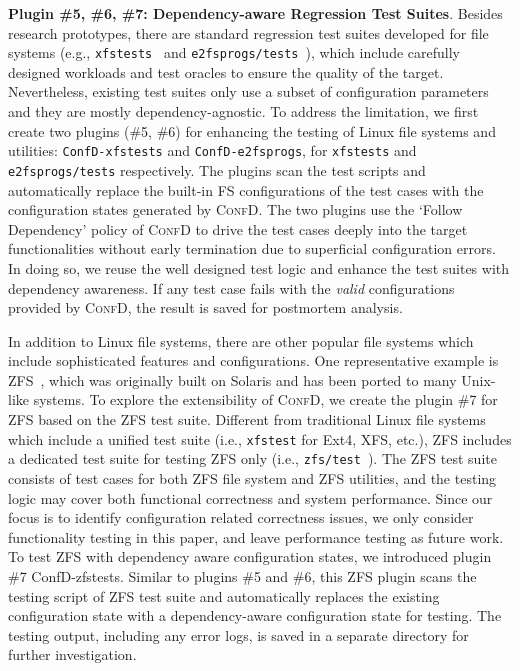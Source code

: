 \smallskip
\noindent
\textbf{Plugin \#5, \#6, \#7: Dependency-aware Regression Test Suites}.
Besides research prototypes, there are  standard regression test suites developed for file systems (e.g., \texttt{xfstests}~\cite{xfstest} and \texttt{e2fsprogs/tests}~\cite{e2fsprogs-test}), which include carefully designed workloads and test oracles to ensure the quality of the target.
Nevertheless, existing test suites 
only use a subset of configuration parameters  and they are mostly  dependency-agnostic.
To address the limitation,  we first create two plugins (\#5, \#6) for enhancing the testing of Linux file systems and utilities:  \texttt{ConfD-xfstests} and \texttt{ConfD-e2fsprogs}, for  \texttt{xfstests} and \texttt{e2fsprogs/tests} respectively.  
The plugins  scan the test scripts and {automatically} replace the built-in FS configurations of the test cases with the configuration states generated by \textsc{ConfD}. The two plugins use the `Follow Dependency' policy of  \textsc{ConfD}  to drive the test cases deeply into the target functionalities without early termination due to superficial configuration errors.  In doing so, we reuse the well designed test logic and enhance the test suites with dependency awareness. 
If any test case fails with the \textit{valid}  configurations provided by \textsc{ConfD}, the result is saved for postmortem analysis. 
 
In addition to Linux file systems, there are other popular file systems which include sophisticated features and configurations. One representative example is ZFS~\cite{zfs}, which was originally built on Solaris and has been ported to many Unix-like systems. To explore the extensibility of  \textsc{ConfD}, we create  the plugin \#7 for ZFS based on the ZFS test suite. Different from  traditional Linux file systems which include a unified test suite (i.e., \texttt{xfstest} for Ext4, XFS, etc.), ZFS includes a dedicated test suite for testing  ZFS only (i.e.,  \texttt{zfs/test}~\cite{zfs}). The ZFS test suite consists of test cases for both ZFS file system and ZFS utilities, and the testing logic  may cover both functional correctness and system performance. 
Since our focus is to identify configuration related correctness issues, we only consider functionality testing in this paper, and leave performance testing  as future work.
To test ZFS with dependency aware configuration states, we introduced plugin \#7 ConfD-zfstests. 
Similar to plugins \#5 and \#6, this ZFS plugin  scans the testing script of ZFS test suite and automatically replaces the existing configuration state with a dependency-aware configuration state for testing. The testing output, including any error logs, is saved in a separate directory for further investigation. 
 
